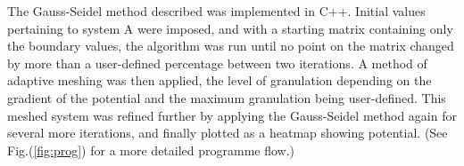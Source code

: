 \documentclass[a4paper]{jpconf}
\begin{document}
The Gauss-Seidel method described was implemented in C++. Initial values pertaining to system A were imposed, and with a starting matrix containing only the boundary values, the algorithm was run until no point on the matrix changed by more than a user-defined percentage between two iterations. A method of adaptive meshing was then applied, the level of granulation depending on the gradient of the potential and the maximum granulation being user-defined. This meshed system was refined further by applying the Gauss-Seidel method again for several more iterations, and finally plotted as a heatmap showing potential. (See Fig.(\ref{fig:prog}) for a more detailed programme flow.) \\ \\ \\ \\ \\ \\

%
%				
%			
%				
\end{document}
